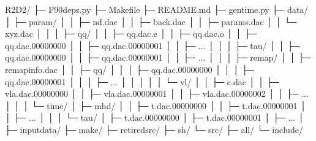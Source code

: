 \documentclass[letterpaper,10pt,dvipdfmx,report]{sphinxmanual}
\begin{document}
\begin{sphinxVerbatim}[commandchars=\\\{\}]
R2D2/
   ├─ F90\PYGZus{}deps.py
   ├─ Makefile
   ├─ README.md
   ├─ gen\PYGZus{}time.py
   ├─ data/
   │     ├─ param/
   │     │      ├─ nd.dac
   │     │      ├─ back.dac
   │     │      ├─ params.dac
   │     │      └─ xyz.dac
   │     │
   │     ├─ qq/
   │     │   ├─ qq.dac.e
   │     │   ├─ qq.dac.o
   │     │   ├─ qq.dac.00000000
   │     │   ├─ qq.dac.00000001
   │     │   ├─ ...
   │     │
   │     ├─ tau/
   │     │   ├─ qq.dac.00000000
   │     │   ├─ qq.dac.00000001
   │     │   ├─ ...
   │     │
   │     ├─ remap/
   │     │      ├─ remap\PYGZus{}info.dac
   │     │      ├─ qq/
   │     │      │   ├─ qq.dac.00000000
   │     │      │   ├─ qq.dac.00000001
   │     │      │   ├─ ...
   │     │      │
   │     │      └─ vl/
   │     │          ├─ c.dac
   │     │          ├─ vla.dac.00000000
   │     │          ├─ vla.dac.00000001
   │     │          ├─ vla.dac.00000002
   │     │          ├─ ...
   │     │
   │     └─ time/
   │           ├─ mhd/
   │           │    ├─ t.dac.00000000
   │           │    ├─ t.dac.00000001
   │           │    ├─ ...
   │           │
   │           └─ tau/
   │                ├─ t.dac.00000000
   │                ├─ t.dac.00000001
   │                ├─ ...
   │
   ├─ input\PYGZus{}data/
   ├─ make/
   ├─ retired\PYGZus{}src/
   ├─ sh/
   └─ src/
        ├─ all/
        └─ include/
\end{sphinxVerbatim}
\end{document}

